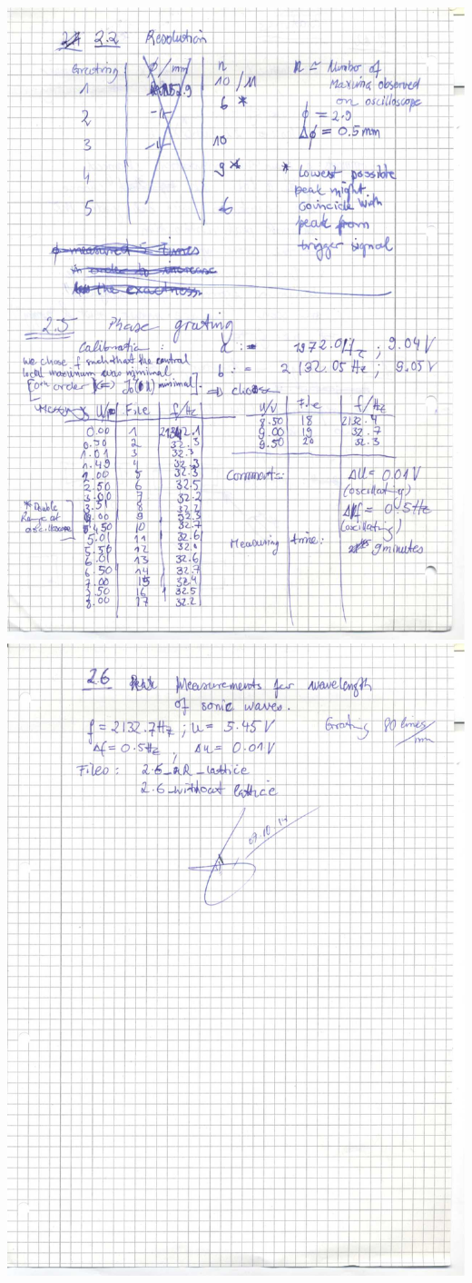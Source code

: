     \includegraphics[width=\linewidth]{appendix/ultra0004.jpg}
    \includegraphics[width=\linewidth]{appendix/ultra0005.jpg}
\clearpage
\FloatBarrier

